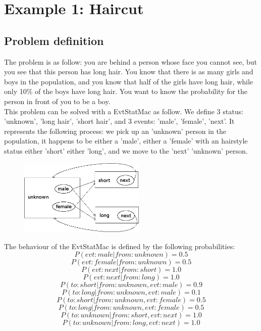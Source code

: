 \documentclass[12pt, a4paper]{article}
\begin{document}
\section{Example 1: Haircut}

\subsection{Problem definition}

The problem is as follow: you are behind a person whose face you cannot see, but you see that this person has long hair. You know that there is as many girls and boys in the population, and you know that half of the girls have long hair, while only 10\% of the boys have long hair. You want to know the probability for the person in front of you to be a boy.\\

This problem can be solved with a EvtStatMac as follow. We define 3 status: 'unknown', 'long hair', 'short hair', and 3 events: 'male', 'female', 'next'. It represents the following process: we pick up an 'unknown' person in the population, it happens to be either a 'male', either a 'female' with an hairstyle status either 'short' either 'long', and we move to the 'next' 'unknown' person.\\

\begin{center}
\begin{figure}[H]
\centering
\includegraphics[width=6cm]{./ex1.jpg}
\end{figure}
\end{center}

The behaviour of the EvtStatMac is defined by the following probabilities:\\
$$P(evt:male|from:unknown)=0.5$$
$$P(evt:female|from:unknown)=0.5$$
$$P(evt:next|from:short)=1.0$$
$$P(evt:next|from:long)=1.0$$
$$P(to:short|from:unknown,evt:male)=0.9$$
$$P(to:long|from:unknown,evt:male)=0.1$$
$$P(to:short|from:unknown,evt:female)=0.5$$
$$P(to:long|from:unknown,evt:female)=0.5$$
$$P(to:unknown|from:short,evt:next)=1.0$$
$$P(to:unknown|from:long,evt:next)=1.0$$
\end{document}
